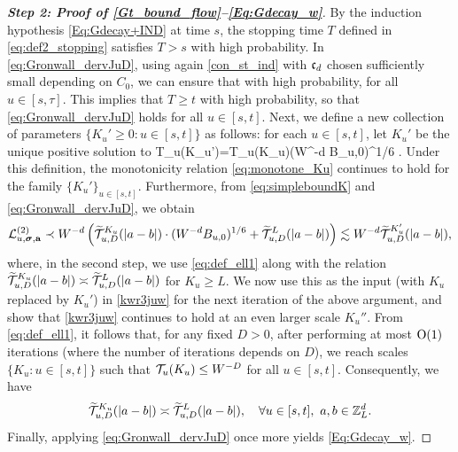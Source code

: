 \begin{proof}[\bf Step 2: Proof of \eqref{Gt_bound_flow}--\eqref{Eq:Gdecay_w}]
 
By the induction hypothesis \eqref{Eq:Gdecay+IND} at time $s$, the stopping time $T$ defined in \eqref{eq:def2_stopping} satisfies $T>s$ with high probability. In \eqref{eq:Gronwall_dervJuD}, using again \eqref{con_st_ind} with $\fc_d$ chosen sufficiently small depending on $C_0$, we can ensure that with high probability,  for all \(u\in [s,\tau]\). This implies that $T\ge t$ with high probability, so that \eqref{eq:Gronwall_dervJuD} holds for all $u\in[s,t]$. 
Next, we define a new collection of parameters $\{K_u'\ge 0:u\in [s,t]\}$ as follows: for each $u\in[s,t]$, let $K_u'$ be the unique positive solution to  
\be\label{eq:def_ell1} 
\cal T_u(K_u')=\cal T_u(K_u)\cdot (W^{-d} {B}_{u,0})^{1/6} . \ee
Under this definition, the monotonicity relation \eqref{eq:monotone_Ku} continues to hold for the family $\{K_u'\}_{u\in[s,t]}$. Furthermore, from \eqref{eq:simpleboundK} and \eqref{eq:Gronwall_dervJuD}, we obtain
\[ {\cal L}^{(2)}_{u,\bsig, \ba}\prec W^{-d} \p{\widetilde{{\cal T}}^{K_u}_{u,D}(|a-b|)\cdot (W^{-d} {B} _{u,0})^{1/6} + \wT_{u,D}^{L}(|a-b|)} \lesssim W^{-d}\widetilde{{\cal T}}^{K_u'}_{u,D}(|a-b|),\]
where, in the second step, we use \eqref{eq:def_ell1} along with the relation $\widetilde{{\cal T}}^{K_u}_{u,D}(|a-b|)\asymp \widetilde{{\cal T}}^{L}_{u,D}(|a-b|)$ for $K_u\ge L$. We now use this as the input (with $K_u$ replaced by $K_u'$) in \eqref{kwr3juw} for the next iteration of the above argument, and show that \eqref{kwr3juw} continues to hold at an even larger scale $K_u''$. From \eqref{eq:def_ell1}, it follows that, for any fixed $D>0$, after performing at most $\OO(1)$ iterations (where the number of iterations depends on $D$), we reach scales $\{K_u:u\in[s,t]\}$ such that $\cal T_u(K_u)\le W^{-D}$ for all $u\in[s,t]$. Consequently, we have %
\[\wT_{u,D}^{K_u}(|a-b|)\asymp \wT_{u,D}^{L}(|a-b|), \quad \forall u\in [s,t], \ a,b\in \Zn.\]
Finally, applying \eqref{eq:Gronwall_dervJuD} once more yields \eqref{Eq:Gdecay_w}.
\end{proof}

